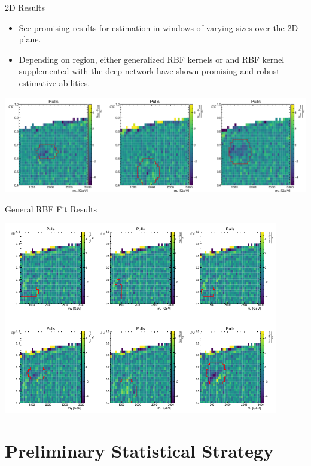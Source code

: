 \documentclass[10pt]{beamer}
\begin{document}
\begin{frame}{2D Results}
  \begin{itemize}
  \item See promising results for estimation in windows of varying sizes over the 2D plane. 
  \item Depending on region, either generalized RBF kernels or and RBF kernel supplemented with the deep network have shown promising and robust estimative abilities.
  \end{itemize}

  \begin{center}
    \includegraphics[width=\textwidth]{figures/nn_results_1} 
  \end{center}
\end{frame}

\begin{frame}{General RBF Fit Results}
  \begin{center}
    \includegraphics[width=0.9\textwidth]{figures/grbf_results} 
  \end{center}
\end{frame}

\section[Statistical Considerations]{Preliminary Statistical Strategy}
\end{document}
